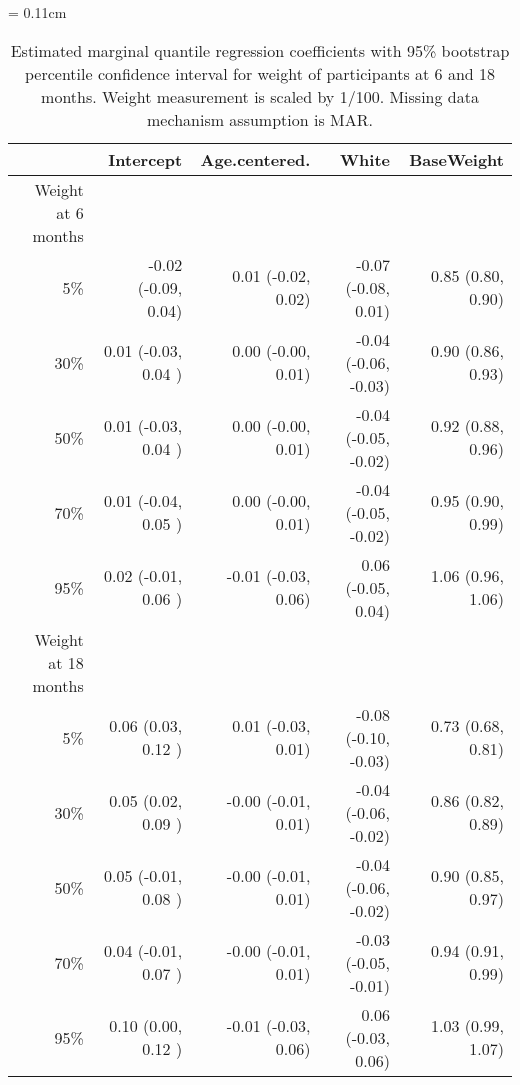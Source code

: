 \documentclass[12pt]{article}
\begin{document}
\begin{table}[ht]
  \renewcommand{\arraystretch}{1.3}
  \begin{center}
    \caption{Estimated marginal quantile regression coefficients with
      95\% bootstrap percentile confidence interval for weight of
      participants at 6 and 18 months. Weight measurement is scaled by
      1/100. Missing data mechanism assumption is MAR.}\label{tab:w2}
    \vspace{10pt} \tabcolsep = 0.11cm
    \begin{tabular}{rrrrr}
      \toprule
           & Intercept           & Age.centered.        & White                & BaseWeight        \\
      \hline
      Weight at 6 months                                                                           \\
      5\%  & -0.02 (-0.09, 0.04) & 0.01 (-0.02, 0.02)   & -0.07 (-0.08, 0.01)  & 0.85 (0.80, 0.90) \\
      30\% & 0.01 (-0.03, 0.04 ) & 0.00 (-0.00, 0.01)   & -0.04 (-0.06, -0.03) & 0.90 (0.86, 0.93) \\
      50\% & 0.01 (-0.03, 0.04 ) & 0.00 (-0.00, 0.01)   & -0.04 (-0.05, -0.02) & 0.92 (0.88, 0.96) \\
      70\% & 0.01 (-0.04, 0.05 ) & 0.00 (-0.00, 0.01)   & -0.04 (-0.05, -0.02) & 0.95 (0.90, 0.99) \\
      95\% & 0.02 (-0.01, 0.06 ) & -0.01 (-0.03, 0.06)  & 0.06 (-0.05, 0.04)   & 1.06 (0.96, 1.06) \\
      Weight at 18 months                                                                          \\
      5\%  & 0.06 (0.03, 0.12 )  & 0.01 (-0.03, 0.01)   & -0.08 (-0.10, -0.03) & 0.73 (0.68, 0.81) \\
      30\% & 0.05 (0.02, 0.09 )  & -0.00 (-0.01, 0.01)  & -0.04 (-0.06, -0.02) & 0.86 (0.82, 0.89) \\
      50\% & 0.05 (-0.01, 0.08 ) & -0.00 (-0.01, 0.01)  & -0.04 (-0.06, -0.02) & 0.90 (0.85, 0.97) \\
      70\% & 0.04 (-0.01, 0.07 ) & -0.00  (-0.01, 0.01) & -0.03 (-0.05, -0.01) & 0.94 (0.91, 0.99) \\
      95\% & 0.10 (0.00, 0.12 )  & -0.01  (-0.03, 0.06) & 0.06 (-0.03, 0.06)   & 1.03 (0.99, 1.07) \\
      \bottomrule
    \end{tabular}
  \end{center}
\end{table}
\end{document}
